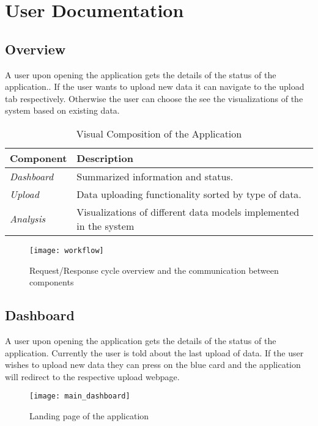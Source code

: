 \chapter{User Documentation} %
\label{ch:user}

\section{Overview}

A user upon opening the application gets the details of the status of the application..
If the user wants to upload new data it can navigate to the upload tab respectively. Otherwise the user 
can choose the see the visualizations of the system based on existing data.

\begin{table}[H]
	\centering
	\begin{tabular}{ | m{} | m{} | }
		\hline
		\textbf{Component} & \textbf{Description} \\
		\hline \hline
		\emph{Dashboard} & Summarized information and status. \\
		\hline
		\emph{Upload} & Data uploading functionality sorted by type of data. \\
		\hline
		\emph{Analysis} & Visualizations of different data models implemented in the system \\
		\hline
	\end{tabular}
	\caption{Visual Composition of the Application}
	\label{tab:overall}
\end{table}


\begin{figure}[H]
	\centering
	\texttt{[image: workflow]}
	\caption{Request/Response cycle overview and the communication between components}
	\label{fig:overview_uml}
\end{figure}

\section{Dashboard}

A user upon opening the application gets the details of the status of the application.
Currently the user is told about the last upload of data. If the user wishes to upload new
data they can press on the blue card and the application will redirect to the respective upload
webpage.

\begin{figure}[H]
	\centering
	\texttt{[image: main\_dashboard]}
	\caption{Landing page of the application}
	\label{fig:landing-page}
\end{figure}

